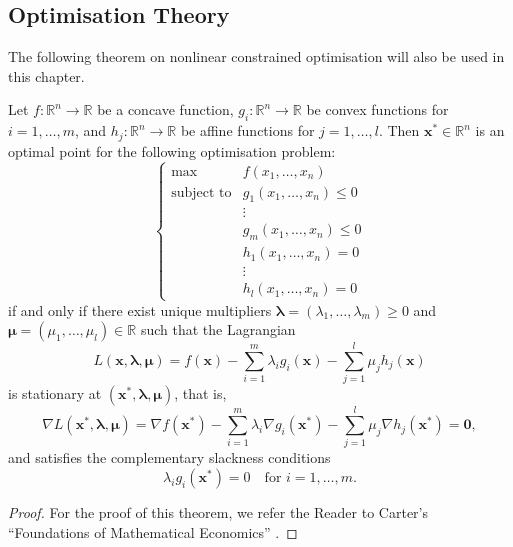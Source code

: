 \subsection{Optimisation Theory} %
\label{sub:optimisation_theory_notation}
The following theorem on nonlinear constrained optimisation will also be used in this chapter.
\begin{thm}
Let $f:\mathbb{R}^n\to\mathbb{R}$ be a concave function, $g_i:\mathbb{R}^n\to\mathbb{R}$ be convex functions for $i=1,\ldots,m$, and $h_j:\mathbb{R}^n\to\mathbb{R}$ be affine functions for $j=1,\ldots,l$. Then $\mathbf{x}^*\in\mathbb{R}^n$ is an optimal point for the following optimisation problem:
\begin{equation*}
	\left\{
	\begin{array}{rl}
		\max &f(x_1,\ldots,x_n)\\
		\text{subject to} &g_1(x_1,\ldots,x_n)\le 0\\
		& \vdots\\
		&g_m(x_1,\ldots,x_n)\le 0\\
		&h_1(x_1,\ldots,x_n) = 0\\
		& \vdots\\
		&h_l(x_1,\ldots,x_n) = 0
	\end{array}
	\right.
\end{equation*}
if and only if there exist unique multipliers $\bm{\lambda}=(\lambda_1,\ldots,\lambda_m)\ge 0$ and $\bm{\mu}=(\mu_1,\ldots,\mu_l)\in\mathbb{R}$ such that the Lagrangian
\begin{equation*}
	L(\mathbf{x},\bm{\lambda},\bm{\mu}) = f(\mathbf{x}) - \sum_{i=1}^m\lambda_i g_i(\mathbf{x}) - \sum_{j=1}^l\mu_j h_j(\mathbf{x})
\end{equation*}
is stationary at $(\mathbf{x}^*,\bm{\lambda},\bm{\mu})$, that is,
\begin{equation*}
	\nabla L(\mathbf{x}^*,\bm{\lambda},\bm{\mu}) = \nabla f(\mathbf{x}^*) - \sum_{i=1}^m\lambda_i \nabla g_i(\mathbf{x}^*) - \sum_{j=1}^l\mu_j \nabla h_j(\mathbf{x}^*) = \mathbf{0},
\end{equation*}
and satisfies the complementary slackness conditions
\begin{equation*}
	\lambda_i g_i(\mathbf{x}^*)=0 \quad\text{for } i=1,\ldots,m.
\end{equation*}
\end{thm}
\begin{proof}
For the proof of this theorem, we refer the Reader to Carter's ``Foundations of Mathematical Economics'' \cite{Carter2001}.
\end{proof}


